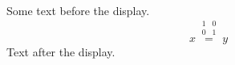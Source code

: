 \documentclass[12pt]{article}
\begin{document}
Some text before the display.
\[ x \overset{\begin{smallmatrix} 1 & 0 \\ 0 & 1 \end{smallmatrix}}{=} y \]
Text after the display.
\end{document}
